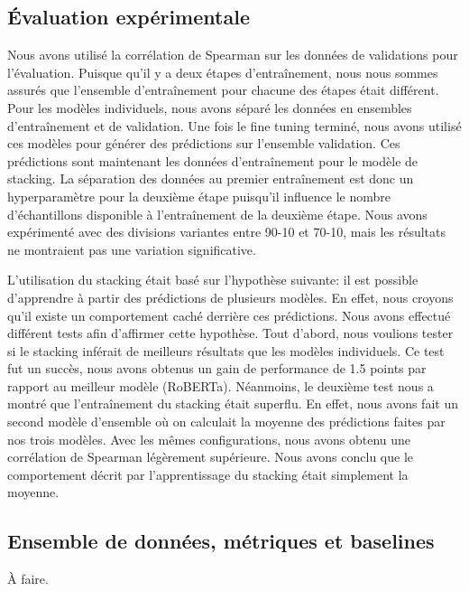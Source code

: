 \documentclass[11pt,a4paper, french]{article}
\begin{document}
\subsection{Évaluation expérimentale }

Nous avons utilisé la corrélation de Spearman sur les données de validations pour l’évaluation. Puisque qu’il y a deux étapes d'entraînement, nous nous sommes assurés que l’ensemble d'entraînement pour chacune des étapes était différent. Pour les modèles individuels, nous avons séparé les données en ensembles d'entraînement et de validation. Une fois le fine tuning terminé, nous avons utilisé ces modèles pour générer des prédictions sur l’ensemble validation. Ces prédictions sont maintenant les données d'entraînement pour le modèle de stacking. La séparation des données au premier entraînement est donc un hyperparamètre pour la deuxième étape puisqu’il influence le nombre d’échantillons disponible à l'entraînement de la deuxième étape. Nous avons expérimenté avec des divisions variantes entre 90-10 et 70-10, mais les résultats ne montraient pas une variation significative. 

	L’utilisation du stacking était basé sur l’hypothèse suivante: il est possible d’apprendre à partir des prédictions de plusieurs modèles. En effet, nous croyons qu’il existe un comportement caché derrière ces prédictions. Nous avons effectué différent tests afin d’affirmer cette hypothèse. Tout d'abord, nous voulions tester si le stacking inférait de meilleurs résultats que les modèles individuels. Ce test fut un succès, nous avons obtenus un gain de performance de 1.5 points par rapport au meilleur modèle (RoBERTa). Néanmoins, le deuxième test nous a montré que l'entraînement du stacking était superflu. En effet, nous avons fait un second modèle d’ensemble où on calculait la moyenne des prédictions faites par nos trois modèles. Avec les mêmes configurations, nous avons obtenu une corrélation de Spearman légèrement supérieure. Nous avons conclu que le comportement décrit par l’apprentissage du stacking était simplement la moyenne.



\subsection{Ensemble de données, métriques et baselines }

À faire. 
\end{document}
